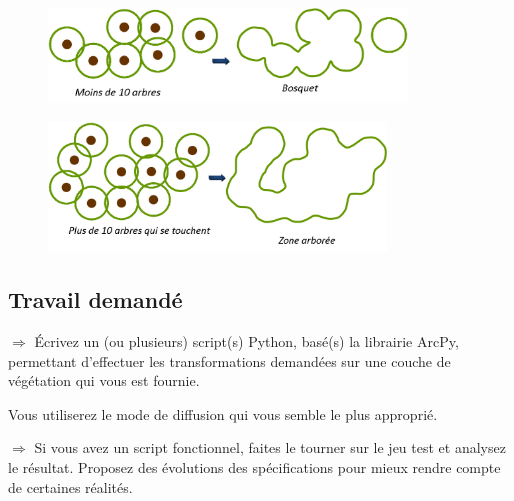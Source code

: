 \documentclass[11pt]{article}
\newcommand{\action}{$\Rightarrow$ }
\begin{document}
\vspace{2em}

\begin{figure}[H]
	\center \includegraphics[width=0.85\textwidth]{img/td_arcpy_da/bosquet.png}\\
\end{figure}

\vspace{2em}

\begin{figure}[H]
	\center \includegraphics[width=0.8\textwidth]{img/td_arcpy_da/zone_arboree.png}\\
\end{figure}


\subsection{Travail demandé}

\action Écrivez un (ou plusieurs) script(s) Python, basé(s) la librairie ArcPy, permettant d'effectuer les transformations demandées sur une couche de végétation qui vous est fournie.

Vous utiliserez le mode de diffusion qui vous semble le plus approprié.


\action Si vous avez un script fonctionnel, faites le tourner sur le jeu test et analysez le résultat. Proposez des évolutions des spécifications pour mieux rendre compte de certaines réalités.
\end{document}
